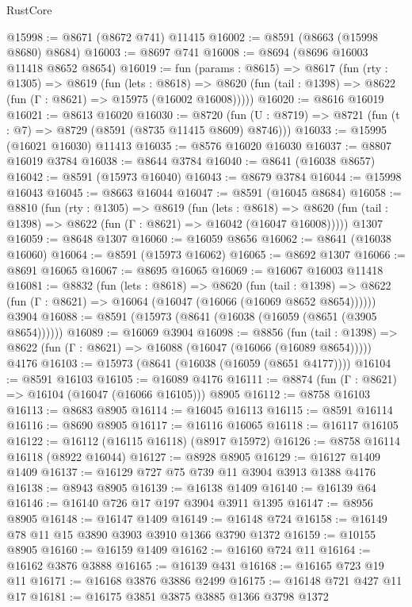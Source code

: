 \begin{lexlean}{RustCore}
\begin{coremodule}
@15998 := @8671 (@8672 @741) @11415
@16002 := @8591 (@8663 (@15998 @8680) @8684)
@16003 := @8697 @741
@16008 := @8694 (@8696 @16003 @11418 @8652 @8654)
@16019 := fun (params : @8615) =>
  @8617
    (fun (rty : @1305) =>
    @8619
      (fun (lets : @8618) =>
      @8620 (fun (tail : @1398) => @8622 (fun (Γ : @8621) => @15975 (@16002 @16008)))))
@16020 := @8616 @16019
@16021 := @8613 @16020
@16030 := @8720
    (fun (U : @8719) => @8721 (fun (t : @7) => @8729 (@8591 (@8735 @11415 @8609) @8746)))
@16033 := @15995 (@16021 @16030) @11413
@16035 := @8576 @16020 @16030
@16037 := @8807 @16019 @3784
@16038 := @8644 @3784
@16040 := @8641 (@16038 @8657)
@16042 := @8591 (@15973 @16040)
@16043 := @8679 @3784
@16044 := @15998 @16043
@16045 := @8663 @16044
@16047 := @8591 (@16045 @8684)
@16058 := @8810
    (fun (rty : @1305) =>
    @8619
      (fun (lets : @8618) =>
      @8620 (fun (tail : @1398) => @8622 (fun (Γ : @8621) => @16042 (@16047 @16008)))))
    @1307
@16059 := @8648 @1307
@16060 := @16059 @8656
@16062 := @8641 (@16038 @16060)
@16064 := @8591 (@15973 @16062)
@16065 := @8692 @1307
@16066 := @8691 @16065
@16067 := @8695 @16065
@16069 := @16067 @16003 @11418
@16081 := @8832
    (fun (lets : @8618) =>
    @8620
      (fun (tail : @1398) =>
      @8622 (fun (Γ : @8621) => @16064 (@16047 (@16066 (@16069 @8652 @8654))))))
    @3904
@16088 := @8591 (@15973 (@8641 (@16038 (@16059 (@8651 (@3905 @8654))))))
@16089 := @16069 @3904
@16098 := @8856
    (fun (tail : @1398) => @8622 (fun (Γ : @8621) => @16088 (@16047 (@16066 (@16089 @8654)))))
    @4176
@16103 := @15973 (@8641 (@16038 (@16059 (@8651 @4177))))
@16104 := @8591 @16103
@16105 := @16089 @4176
@16111 := @8874 (fun (Γ : @8621) => @16104 (@16047 (@16066 @16105))) @8905
@16112 := @8758 @16103
@16113 := @8683 @8905
@16114 := @16045 @16113
@16115 := @8591 @16114
@16116 := @8690 @8905
@16117 := @16116 @16065
@16118 := @16117 @16105
@16122 := @16112 (@16115 @16118) (@8917 @15972)
@16126 := @8758 @16114 @16118 (@8922 @16044)
@16127 := @8928 @8905
@16129 := @16127 @1409 @1409
@16137 := @16129 @727 @75 @739 @11 @3904 @3913 @1388 @4176
@16138 := @8943 @8905
@16139 := @16138 @1409
@16140 := @16139 @64
@16146 := @16140 @726 @17 @197 @3904 @3911 @1395
@16147 := @8956 @8905
@16148 := @16147 @1409
@16149 := @16148 @724
@16158 := @16149 @78 @11 @15 @3890 @3903 @3910 @1366 @3790 @1372
@16159 := @10155 @8905
@16160 := @16159 @1409
@16162 := @16160 @724 @11
@16164 := @16162 @3876 @3888
@16165 := @16139 @431
@16168 := @16165 @723 @19 @11
@16171 := @16168 @3876 @3886 @2499
@16175 := @16148 @721 @427 @11 @17
@16181 := @16175 @3851 @3875 @3885 @1366 @3798 @1372

\end{coremodule}
\end{lexlean}
